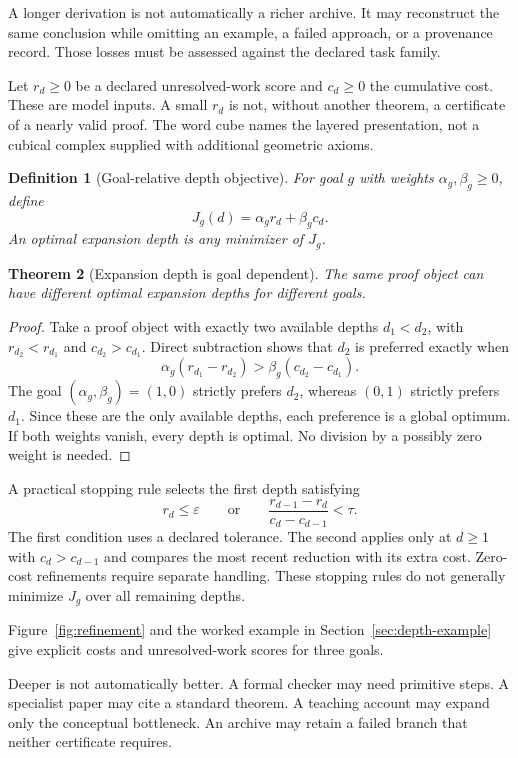 \documentclass[11pt,oneside]{article}
\theoremstyle{komorebiplain}
\newtheorem{theorem}{Theorem}[section]
\theoremstyle{komorebidefinition}
\newtheorem{definition}[theorem]{Definition}
\theoremstyle{komorebiremark}
\begin{document}
A longer derivation is not automatically a richer archive. It may reconstruct the same conclusion while omitting an example, a failed approach, or a provenance record. Those losses must be assessed against the declared task family.

Let $r_d\geq0$ be a declared unresolved-work score and $c_d\geq0$ the cumulative cost. These are model inputs. A small $r_d$ is not, without another theorem, a certificate of a nearly valid proof. The word cube names the layered presentation, not a cubical complex supplied with additional geometric axioms.

\begin{definition}[Goal-relative depth objective]
\label{res:19:2}
For goal $g$ with weights $\alpha_g,\beta_g\ge0$, define
\[
J_g(d)=\alpha_g r_d+\beta_g c_d.
\]
An optimal expansion depth is any minimizer of $J_g$.
\end{definition}

\begin{theorem}[Expansion depth is goal dependent]
\label{res:19:3}
The same proof object can have different optimal expansion depths for different goals.
\end{theorem}

\begin{proof}
Take a proof object with exactly two available depths $d_1<d_2$, with $r_{d_2}<r_{d_1}$ and $c_{d_2}>c_{d_1}$. Direct subtraction shows that $d_2$ is preferred exactly when
\[
\alpha_g(r_{d_1}-r_{d_2})>\beta_g(c_{d_2}-c_{d_1}).
\]
The goal $(\alpha_g,\beta_g)=(1,0)$ strictly prefers $d_2$, whereas $(0,1)$ strictly prefers $d_1$. Since these are the only available depths, each preference is a global optimum. If both weights vanish, every depth is optimal. No division by a possibly zero weight is needed.
\end{proof}

A practical stopping rule selects the first depth satisfying
\[
r_d\le\varepsilon\qquad\text{or}\qquad
\frac{r_{d-1}-r_d}{c_d-c_{d-1}}<\tau.
\]
The first condition uses a declared tolerance. The second applies only at $d\geq1$ with $c_d>c_{d-1}$ and compares the most recent reduction with its extra cost. Zero-cost refinements require separate handling. These stopping rules do not generally minimize $J_g$ over all remaining depths.

Figure~\ref{fig:refinement} and the worked example in Section~\ref{sec:depth-example} give explicit costs and unresolved-work scores for three goals.

Deeper is not automatically better. A formal checker may need primitive steps. A specialist paper may cite a standard theorem. A teaching account may expand only the conceptual bottleneck. An archive may retain a failed branch that neither certificate requires.
\end{document}
